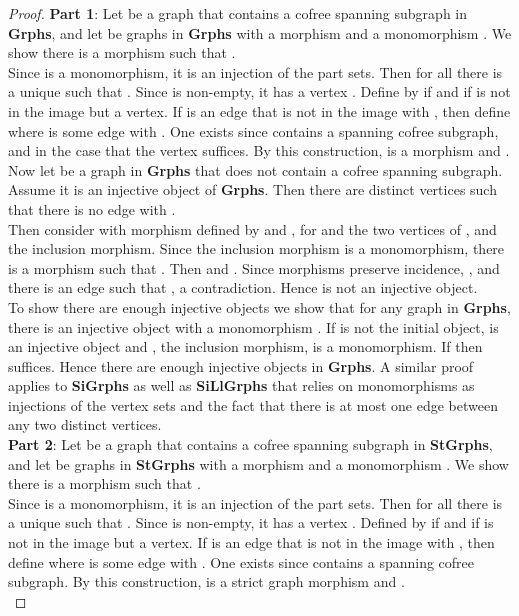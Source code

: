 \documentclass[11pt]{article}
\begin{document}
\begin{proof}
\textbf{Part 1}: Let  be a graph that contains a cofree spanning subgraph in \textbf{Grphs}, and let  be graphs in \textbf{Grphs} with a morphism  and a monomorphism . We show there is a morphism  such that .\\
\indent Since  is a monomorphism, it is an injection of the part sets. Then for all  there is a unique  such that . Since  is non-empty, it has a vertex . Define  by  if  and  if  is not in the image but a vertex. If  is an edge that is not in the image with \textunderscore, then define  where  is some edge with \textunderscore. One exists since  contains a spanning cofree subgraph, and in the case that  the vertex suffices. By this construction,  is a  morphism and .\\
\indent Now let  be a graph in \textbf{Grphs} that does not contain a cofree spanning subgraph. Assume it is an injective object of \textbf{Grphs}. Then there are distinct vertices  such that there is no edge  with \textunderscore.\\
\indent Then consider  with morphism  defined by  and , for  and  the two vertices of , and  the inclusion morphism. Since the inclusion morphism is a monomorphism, there is a morphism  such that . Then  and . Since morphisms preserve incidence, \textunderscore\textunderscore, and there is an edge  such that \textunderscore, a contradiction. Hence  is not an injective object.\\
\indent To show there are enough injective objects we show that for any graph  in \textbf{Grphs}, there is an injective object  with a monomorphism . If  is not the initial object,  is an injective object and , the inclusion morphism, is a monomorphism. If  then  suffices. Hence there are enough injective objects in \textbf{Grphs}. A similar proof applies to \textbf{SiGrphs} as well as \textbf{SiLlGrphs} that relies on monomorphisms as injections of the vertex sets and the fact that there is at most one edge between any two distinct vertices.\\
\indent \textbf{Part 2}: Let  be a graph that contains a cofree spanning subgraph in \textbf{StGrphs}, and let  be graphs in \textbf{StGrphs} with a morphism  and a monomorphism . We show there is a morphism  such that .\\
\indent Since  is a monomorphism, it is an injection of the part sets. Then for all  there is a unique  such that . Since  is non-empty, it has a vertex . Defined  by  if  and  if  is not in the image but a vertex. If  is an edge that is not in the image with \textunderscore, then define  where  is some edge with \textunderscore. One exists since  contains a spanning cofree subgraph. By this construction,  is a strict graph morphism and .\\

\end{proof}
\end{document}
